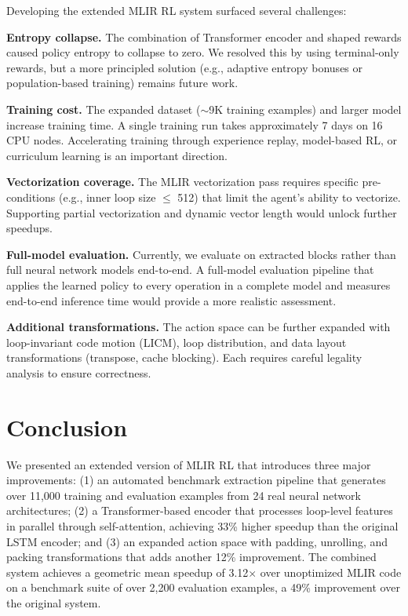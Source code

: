\documentclass[10pt,twocolumn]{article}
\begin{document}
Developing the extended MLIR RL system surfaced several challenges:

\textbf{Entropy collapse.} The combination of Transformer encoder and shaped rewards caused policy entropy to collapse to zero. We resolved this by using terminal-only rewards, but a more principled solution (e.g., adaptive entropy bonuses or population-based training) remains future work.

\textbf{Training cost.} The expanded dataset ($\sim$9K training examples) and larger model increase training time. A single training run takes approximately 7 days on 16 CPU nodes. Accelerating training through experience replay, model-based RL, or curriculum learning is an important direction.

\textbf{Vectorization coverage.} The MLIR vectorization pass requires specific pre-conditions (e.g., inner loop size $\leq$ 512) that limit the agent's ability to vectorize. Supporting partial vectorization and dynamic vector length would unlock further speedups.

\textbf{Full-model evaluation.} Currently, we evaluate on extracted blocks rather than full neural network models end-to-end. A full-model evaluation pipeline that applies the learned policy to every operation in a complete model and measures end-to-end inference time would provide a more realistic assessment.

\textbf{Additional transformations.} The action space can be further expanded with loop-invariant code motion (LICM), loop distribution, and data layout transformations (transpose, cache blocking). Each requires careful legality analysis to ensure correctness.

\section{Conclusion}

We presented an extended version of MLIR RL that introduces three major improvements: (1) an automated benchmark extraction pipeline that generates over 11,000 training and evaluation examples from 24 real neural network architectures; (2) a Transformer-based encoder that processes loop-level features in parallel through self-attention, achieving 33\% higher speedup than the original LSTM encoder; and (3) an expanded action space with padding, unrolling, and packing transformations that adds another 12\% improvement. The combined system achieves a geometric mean speedup of 3.12$\times$ over unoptimized MLIR code on a benchmark suite of over 2,200 evaluation examples, a 49\% improvement over the original system.
\end{document}
